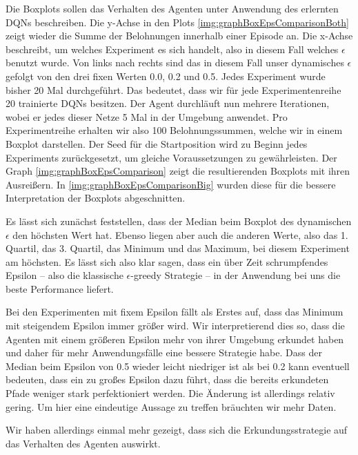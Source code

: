 Die Boxplots sollen das Verhalten des Agenten unter Anwendung des erlernten DQNs beschreiben. Die y-Achse in den Plots \ref{img:graphBoxEpsComparisonBoth} zeigt wieder die Summe der Belohnungen innerhalb einer Episode an. Die x-Achse beschreibt, um welches Experiment es sich handelt, also in diesem Fall welches $ \epsilon $ benutzt wurde. Von links nach rechts sind das in diesem Fall unser dynamisches $ \epsilon $ gefolgt von den drei fixen Werten 0.0, 0.2 und 0.5. Jedes Experiment wurde bisher 20 Mal durchgeführt. Das bedeutet, dass wir für jede Experimentenreihe 20 trainierte DQNs besitzen. Der Agent durchläuft nun mehrere Iterationen, wobei er jedes dieser Netze 5 Mal in der Umgebung anwendet. Pro Experimentreihe erhalten wir also 100 Belohnungssummen, welche wir in einem Boxplot darstellen. Der Seed für die Startposition wird zu Beginn jedes Experiments zurückgesetzt, um gleiche Voraussetzungen zu gewährleisten. Der Graph \ref{img:graphBoxEpsComparison} zeigt die resultierenden Boxplots mit ihren Ausreißern. In \ref{img:graphBoxEpsComparisonBig} wurden diese für die bessere Interpretation der Boxplots abgeschnitten.

Es lässt sich zunächst feststellen, dass der Median beim Boxplot des dynamischen $ \epsilon $ den höchsten Wert hat. Ebenso liegen aber auch die anderen Werte, also das 1. Quartil, das 3. Quartil, das Minimum und das Maximum, bei diesem Experiment am höchsten. Es lässt sich also klar sagen, dass ein über Zeit schrumpfendes Epsilon -- also die klassische $ \epsilon $-greedy Strategie -- in der Anwendung bei uns die beste Performance liefert.

Bei den Experimenten mit fixem Epsilon fällt als Erstes auf, dass das Minimum mit steigendem Epsilon immer größer wird. Wir interpretierend dies so, dass die Agenten mit einem größeren Epsilon mehr von ihrer Umgebung erkundet haben und daher für mehr Anwendungsfälle eine bessere Strategie habe. Dass der Median beim Epsilon von 0.5 wieder leicht niedriger ist als bei 0.2 kann eventuell bedeuten, dass ein zu großes Epsilon dazu führt, dass die bereits erkundeten Pfade weniger stark perfektioniert werden. Die Änderung ist allerdings relativ gering. Um hier eine eindeutige Aussage zu treffen bräuchten wir mehr Daten.

Wir haben allerdings einmal mehr gezeigt, dass sich die Erkundungsstrategie auf das Verhalten des Agenten auswirkt.

